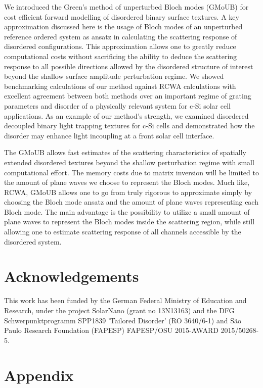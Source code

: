 \documentclass[ floatfix,reprint,amsmath,amssymb,aps,prb]{revtex4-1}
\begin{document}
We introduced the Green's method of unperturbed Bloch modes (GMoUB) for cost efficient forward modelling of disordered binary surface textures. A key approximation discussed here is the usage of Bloch modes of an unperturbed reference ordered system as ansatz in calculating the scattering response of disordered configurations. This approximation allows one to greatly reduce computational costs without sacrificing the ability to deduce the scattering response to all possible directions allowed by the disordered structure of interest beyond the shallow surface amplitude perturbation regime. We showed benchmarking calculations of our method against RCWA calculations with excellent agreement between both methods over an important regime of grating parameters and disorder of a physically relevant system for c-Si solar cell applications. As an example of our method's strength, we examined disordered decoupled binary light trapping textures for c-Si cells and demonstrated how the disorder may enhance light incoupling at a front solar cell interface. 

The GMoUB allows fast estimates of the scattering characteristics of spatially extended disordered textures beyond the shallow perturbation regime with small computational effort. The memory costs due to matrix inversion will be limited to the amount of plane waves we choose to represent the Bloch modes. Much like, RCWA, GMoUB allows one to go from truly rigorous to approximate simply by choosing the Bloch mode ansatz and the amount of plane waves representing each Bloch mode. The main advantage is the possibility to utilize a small amount of plane waves to represent the Bloch modes inside the scattering region, while still allowing one to estimate scattering response of all channels accessible by the disordered system.

\section{Acknowledgements}

This work has been funded by the German Federal Ministry of Education and Research, under the project SolarNano (grant no 13N13163) and the DFG Schwerpunktprogramm SPP1839 'Tailored Disorder' (RO 3640/6-1) and S\~{a}o Paulo Research Foundation (FAPESP) FAPESP/OSU 2015-AWARD 2015/50268-5.

\section{Appendix}
\end{document}
